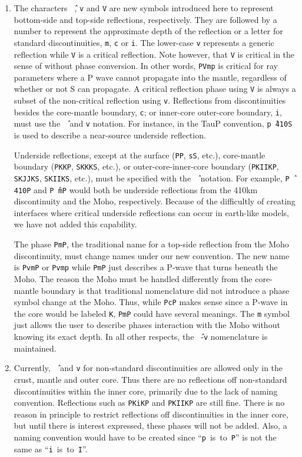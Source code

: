 \begin{enumerate}
\item \label{carrotv}
The characters \texttt{\^\,}, \texttt{v} and \texttt{V} are new symbols introduced here to
represent bottom-side and top-side reflections, respectively.
They are followed by a number to
represent the approximate depth of the reflection or
a letter for standard discontinuities, \texttt{m}, \texttt{c} or \texttt{i}.
The lower-case \texttt{v} represents a generic reflection while \texttt{V} is
a critical reflection. Note however, that  \texttt{V} is critical in the sense of
without phase conversion. In other words, \texttt{PVmp} is critical for ray parameters
where a P wave cannot propagate into the mantle, regardless of whether
or not S can propagate. A critical reflection phase using \texttt{V} is always
a subset of the non-critical reflection using \texttt{v}.
Reflections from discontinuities besides the
core-mantle boundary, \texttt{c};
or inner-core outer-core boundary, \texttt{i}, must use the \texttt{\^\,}
and \texttt{v} notation.
For instance, in the TauP convention, \texttt{p\^\,410S} is used to describe
a near-source underside reflection.

Underside reflections, except at the
surface (\texttt{PP}, \texttt{sS}, etc.),
core-mantle boundary (\texttt{PKKP}, \texttt{SKKKS}, etc.), or
outer-core-inner-core boundary (\texttt{PKIIKP}, \texttt{SKJJKS},
\texttt{SKIIKS}, etc.), must
be specified with the \texttt{\^\,} notation.
For example, \texttt{P\^\,410P} and
\texttt{P\^\,mP} would both be underside
reflections from the 410km discontinuity and the Moho, respectively.
Because of the difficultly of creating interfaces where critical underside reflections
can occur in earth-like models, we have not added this capability.

The phase \texttt{PmP}, the traditional name for a top-side reflection from the Moho
discontinuity, must change names under our new convention.
The new name is \texttt{PvmP} or \texttt{Pvmp}
while \texttt{PmP} just describes a P-wave that turns beneath the Moho.
The reason the Moho must be handled differently from the core-mantle boundary is that
traditional nomenclature did not introduce a phase symbol change at the Moho.
Thus, while \texttt{PcP} makes sense since a P-wave in the core would be labeled
\texttt{K}, \texttt{PmP} could have several meanings.
The \texttt{m} symbol just allows the user to describe phases interaction with the Moho
without knowing its exact depth.
In all other respects, the \texttt{\^\,}-\texttt{v} nomenclature is maintained.

\item
Currently, \texttt{\^\,} and \texttt{v} for non-standard
discontinuities are allowed only in
the crust, mantle and outer core. Thus there are no reflections off non-standard
discontinuities within the inner core, primarily due to the lack of naming convention.
Reflections such as \texttt{PKiKP} and \texttt{PKIIKP} are
still fine.
There is no
reason in principle to restrict reflections off discontinuities in the
inner core, but until there is interest expressed, these phases will not be added.
Also, a naming convention would have to be created since
``\texttt{p}~is~to~\texttt{P}'' is not the same as
``\texttt{i}~is~to~\texttt{I}''.


\end{enumerate}
